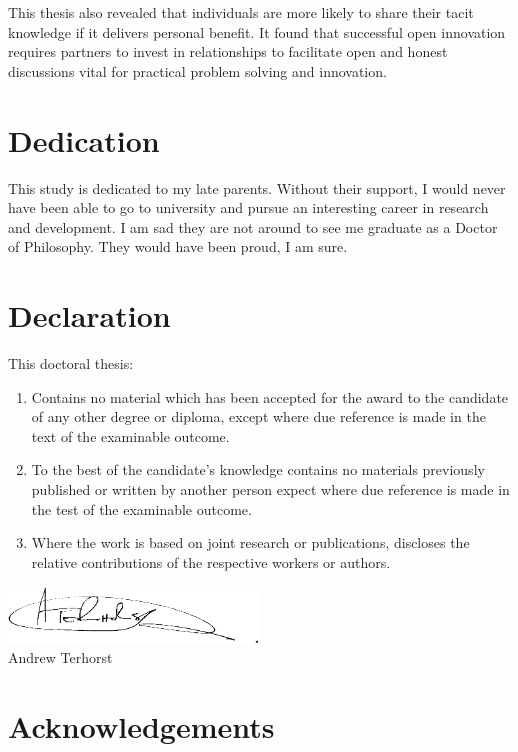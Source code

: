 \documentclass[12pt,table,xcdraw]{book}
\renewcommand{\today}{\the\day \ \monthname \ \the\year}
\begin{document}
This thesis also revealed that individuals are more likely to share their tacit knowledge if it delivers personal benefit. It found that successful open innovation requires partners to invest in relationships to facilitate open and honest discussions vital for practical problem solving and innovation.

\chapter*{Dedication}

This study is dedicated to my late parents. Without their support, I would never have been able to go to university and pursue an interesting career in research and development. I am sad they are not around to see me graduate as a Doctor of Philosophy. They would have been proud, I am sure.

\chapter*{Declaration}

This doctoral thesis:

\begin{enumerate}
    \item Contains no material which has been accepted for the award to the candidate of any other degree or diploma, except where due reference is made in the text of the examinable outcome.
    \item To the best of the candidate’s knowledge contains no materials previously published or written by another person expect where due reference is made in the test of the examinable outcome.
    \item Where the work is based on joint research or publications, discloses the relative contributions of the respective workers or authors.
\end{enumerate} \bigskip

\includegraphics[width = 0.5\textwidth]{Images/Signature.png}\\
Andrew Terhorst\\
\shortdate{\today}

\chapter*{Acknowledgements}
\end{document}
